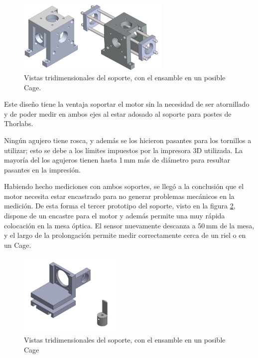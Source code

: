 \begin{figure}[H]
\centering
\includegraphics[width=0.65\textwidth]{fig/perfilador/soporte_v2}
\caption{Vistas tridimensionales del soporte, con el ensamble en un posible Cage.}
\label{fig:perfilador/soporte_v2}
\end{figure}

Este diseño tiene la ventaja soportar el motor sin la necesidad de ser atornillado y de poder medir en ambos ejes al estar adosado al soporte para postes de Thorlabs.

Ningún agujero tiene rosca, y además se los hicieron pasantes para los tornillos a utilizar; esto se debe a los límites impuestos por la impresora 3D utilizada. La mayoría del los agujeros tienen hasta 1$\,$mm más de diámetro para resultar pasantes en la impresión.

Habiendo hecho mediciones con ambos soportes, se llegó a la conclusión que el motor necesita estar encastrado para no generar problemas mecánicos en la medición. De esta forma el tercer prototipo del soporte, visto en la figura \ref{fig:perfilador/soporte_v3}, dispone de un encastre para el motor y además permite una muy rápida colocación en la mesa óptica. El sensor nuevamente descanza a 50$\,$mm de la mesa, y el largo de la prolongación permite medir correctamente cerca de un riel o en un Cage.

\begin{figure}[H]
\centering
\includegraphics[width=0.45\textwidth]{fig/perfilador/soporte_v3}
\caption{Vistas tridimensionales del soporte, con el ensamble en un posible Cage}
\label{fig:perfilador/soporte_v3}
\end{figure}

